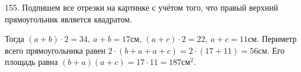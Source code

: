 155. Подпишем все отрезки на картинке с учётом того, что правый верхний прямоугольник является квадратом.
\begin{center}
\begin{figure}[ht!]
\end{figure}
\end{center}
Тогда $(a+b)\cdot2=34,\ a+b=17$см, $(a+c)\cdot2=22,\ a+c=11$см. Периметр всего прямоугольника равен $2\cdot(b+a+a+c)=2\cdot(17+11)=56$см. Его площадь равна $(b+a)(a+c)=17\cdot11=187\text{см}^2.$\newpage\noindent
